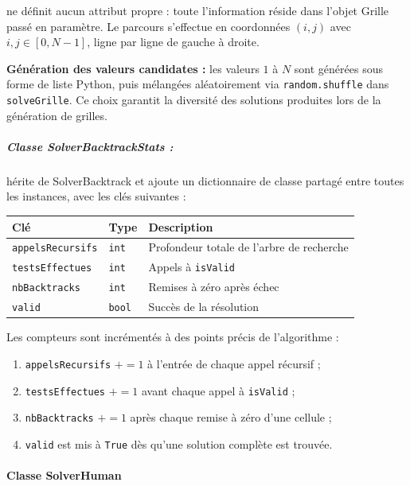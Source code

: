 \documentclass[a4paper]{article}
\begin{document}
ne définit aucun attribut propre : toute l'information réside dans
l'objet Grille passé en paramètre. Le parcours s'effectue en coordonnées $(i, j)$
avec $i, j \in [0, N-1]$, ligne par ligne de gauche à droite.

\medskip
\noindent\textbf{Génération des valeurs candidates :} les valeurs $1$ à $N$ sont générées
sous forme de liste Python, puis mélangées aléatoirement via \texttt{random.shuffle}
dans \texttt{solveGrille}. Ce choix garantit la diversité des solutions produites lors de la
génération de grilles.

\subparagraph{Classe SolverBacktrackStats :}
hérite de SolverBacktrack et ajoute un dictionnaire de classe partagé entre toutes les instances, avec les clés suivantes :

\begin{center}
\begin{tabular}{lll}
  \toprule
  \textbf{Clé} & \textbf{Type} & \textbf{Description} \\
  \midrule
  \texttt{appelsRecursifs} & \texttt{int} & Profondeur totale de l'arbre de recherche \\
  \texttt{testsEffectues}  & \texttt{int} & Appels à \texttt{isValid} \\
  \texttt{nbBacktracks}    & \texttt{int} & Remises à zéro après échec \\
  \texttt{valid}           & \texttt{bool} & Succès de la résolution \\
  \bottomrule
\end{tabular}
\end{center}

Les compteurs sont incrémentés à des points précis de l'algorithme :

\begin{enumerate}[noitemsep]
  \item \texttt{appelsRecursifs} $\mathrel{+}= 1$ à l'entrée de chaque appel récursif ;
  \item \texttt{testsEffectues} $\mathrel{+}= 1$ avant chaque appel à \texttt{isValid} ;
  \item \texttt{nbBacktracks} $\mathrel{+}= 1$ après chaque remise à zéro d'une cellule ;
  \item \texttt{valid} est mis à \texttt{True} dès qu'une solution complète est trouvée.
\end{enumerate}


\paragraph{Classe SolverHuman}
\end{document}
